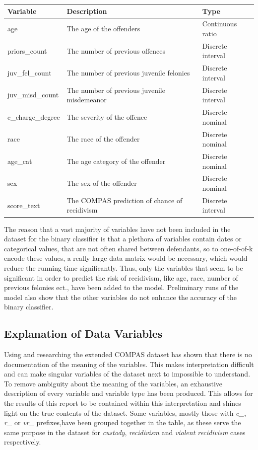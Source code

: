 \documentclass[11pt, fleqn, titlepage]{article}
\begin{document}
	
	\begin{table}[H]\label{resultater}
		\centering
		\begin{tabular}{l l l}
			Variable & Description & Type \\ \hline
			age & The age of the offenders & Continuous ratio \\
			priors\_count & The number of previous offences & Discrete interval \\
			juv\_fel\_count & The number of previous juvenile felonies & Discrete interval \\
			juv\_misd\_count & The number of previous juvenile misdemeanor & Discrete interval \\
			c\_charge\_degree & The severity of the offence & Discrete nominal \\
			race & The race of the offender & Discrete nominal \\
			age\_cat & The age category of the offender & Discrete nominal \\
			sex & The sex of the offender & Discrete nominal \\
			score\_text & The COMPAS prediction of chance of recidivism & Discrete interval
		\end{tabular}
	\end{table}
	The reason that a vast majority of variables have not been included in the dataset for the binary classifier is that a plethora of variables contain dates or categorical values, that are not often shared between defendants, so to one-of-of-k encode these values, a really large data matrix would be necessary, which would reduce the running time significantly. Thus, only the variables that seem to be significant in order to predict the risk of recidivism, like age, race, number of previous felonies ect., have been added to the model. Preliminary runs of the model also show that the other variables do not enhance the accuracy of the binary classifier.
		
		
	\subsection{Explanation of Data Variables} \label{dataExamination}
	Using and researching the extended COMPAS dataset has shown that there is no documentation of the meaning of the variables. This makes interpretation difficult and can make singular variables of the dataset next to impossible to understand. To remove ambiguity about the meaning of the variables, an exhaustive description of every variable and variable type has been produced. This allows for the results of this report to be contained within this interpretation and shines light on the true contents of the dataset. Some variables, mostly those with \textit{c\_}, \textit{r\_} or \textit{vr\_} prefixes,have been grouped together in the table, as these serve the same purpose in the dataset for \textit{custody}, \textit{recidivism} and \textit{violent recidivism} cases respectively. 
	
\end{document}
